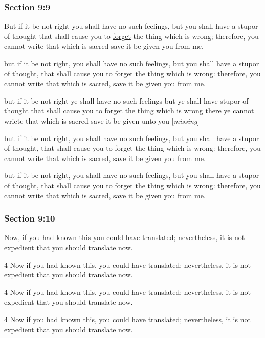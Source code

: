 	\subsubsection{Section 9:9} %
		\label{DC9-9}

		But if it be not right you shall have no such feelings, but you shall have a stupor of thought that shall cause you to \hyperref[FORGET]{forget} the thing which is wrong; therefore, you cannot write that which is sacred save it be given you from me.

		\begin{framed}
		\scriptsize
			\begin{compactdesc}
				\item[JSP] but if it be not right, you shall have no such feelings, but you shall have a stupor of thought, that shall cause you to forget the thing which is wrong: therefore, you cannot write that which is sacred, save it be given you from me.
				\item[RB1] but if it be not right ye shall have no such feelings but ye shall have stupor of thought that shall cause you to forget the thing which is wrong there ye cannot wriete that which is sacred save it be given unto you [\textit{missing}]
				\item[DC 1835] but if it be not right, you shall have no such feelings, but you shall have a stupor of thought, that shall cause you to forget the thing which is wrong: therefore, you cannot write that which is sacred, save it be given you from me.
				\item[DC 1844] but if it be not right, you shall have no such feelings, but you shall have a stupor of thought, that shall cause you to forget the thing which is wrong: therefore, you cannot write that which is sacred, save it be given you from me.
			\end{compactdesc}
		\end{framed}

	\subsubsection{Section 9:10} %
		\label{DC9-10}

		Now, if you had known this you could have translated; nevertheless, it is not \hyperref[EXPEDIENT]{expedient} that you should translate now.

		\begin{framed}
		\scriptsize
			\begin{compactdesc}
				\item[JSP] 4 Now if you had known this, you could have translated: nevertheless, it is not expedient that you should translate now. 
				\item[RB1] [\textit{missing}]
				\item[DC 1835] 4 Now if you had known this, you could have translated; nevertheless, it is not expedient that you should translate now. 
				\item[DC 1844] 4 Now if you had known this, you could have translated; nevertheless, it is not expedient that you should translate now.
			\end{compactdesc}
		\end{framed}

